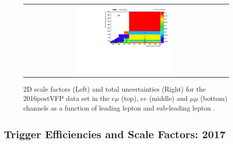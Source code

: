 \begin{figure}[h]
\begin{center}
\begin{tabular}{cc}
      \includegraphics[width=0.50\textwidth]{fig_2016postVFP_TrigSF/h2D_lepABpt_mumu_BinErrors.pdf}\\
    \end{tabular}
    \caption{2D scale factors (Left) and total uncertainties (Right) for the 2016postVFP data set in the $e\mu$ (top), $ee$ (middle) and $\mu\mu$ (bottom) channels as a function of leading lepton \pT and sub-leading lepton \pT.}
    \label{TrigSF_2016postVFP_4}
  \end{center}
\end{figure}

\clearpage
\subsection{Trigger Efficiencies and Scale Factors: 2017}
\label{TrigSFResults2017}

